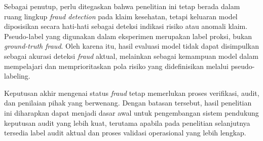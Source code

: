 Sebagai penutup, perlu ditegaskan bahwa penelitian ini tetap berada dalam ruang lingkup \emph{fraud detection} pada klaim kesehatan, tetapi keluaran model diposisikan secara hati-hati sebagai deteksi indikasi risiko atau anomali klaim. Pseudo-label yang digunakan dalam eksperimen merupakan label proksi, bukan \emph{ground-truth fraud}. Oleh karena itu, hasil evaluasi model tidak dapat disimpulkan sebagai akurasi deteksi \emph{fraud} aktual, melainkan sebagai kemampuan model dalam mempelajari dan memprioritaskan pola risiko yang didefinisikan melalui pseudo-labeling.

Keputusan akhir mengenai status \emph{fraud} tetap memerlukan proses verifikasi, audit, dan penilaian pihak yang berwenang. Dengan batasan tersebut, hasil penelitian ini diharapkan dapat menjadi dasar awal untuk pengembangan sistem pendukung keputusan audit yang lebih kuat, terutama apabila pada penelitian selanjutnya tersedia label audit aktual dan proses validasi operasional yang lebih lengkap.
